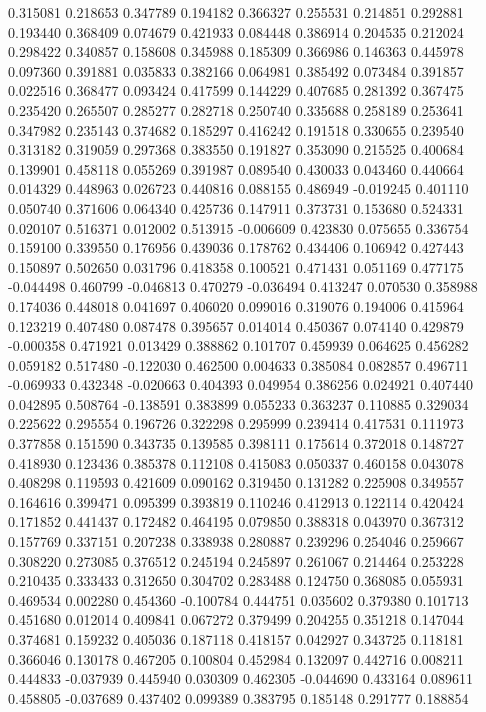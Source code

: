 0.315081
0.218653
0.347789
0.194182
0.366327
0.255531
0.214851
0.292881
0.193440
0.368409
0.074679
0.421933
0.084448
0.386914
0.204535
0.212024
0.298422
0.340857
0.158608
0.345988
0.185309
0.366986
0.146363
0.445978
0.097360
0.391881
0.035833
0.382166
0.064981
0.385492
0.073484
0.391857
0.022516
0.368477
0.093424
0.417599
0.144229
0.407685
0.281392
0.367475
0.235420
0.265507
0.285277
0.282718
0.250740
0.335688
0.258189
0.253641
0.347982
0.235143
0.374682
0.185297
0.416242
0.191518
0.330655
0.239540
0.313182
0.319059
0.297368
0.383550
0.191827
0.353090
0.215525
0.400684
0.139901
0.458118
0.055269
0.391987
0.089540
0.430033
0.043460
0.440664
0.014329
0.448963
0.026723
0.440816
0.088155
0.486949
-0.019245
0.401110
0.050740
0.371606
0.064340
0.425736
0.147911
0.373731
0.153680
0.524331
0.020107
0.516371
0.012002
0.513915
-0.006609
0.423830
0.075655
0.336754
0.159100
0.339550
0.176956
0.439036
0.178762
0.434406
0.106942
0.427443
0.150897
0.502650
0.031796
0.418358
0.100521
0.471431
0.051169
0.477175
-0.044498
0.460799
-0.046813
0.470279
-0.036494
0.413247
0.070530
0.358988
0.174036
0.448018
0.041697
0.406020
0.099016
0.319076
0.194006
0.415964
0.123219
0.407480
0.087478
0.395657
0.014014
0.450367
0.074140
0.429879
-0.000358
0.471921
0.013429
0.388862
0.101707
0.459939
0.064625
0.456282
0.059182
0.517480
-0.122030
0.462500
0.004633
0.385084
0.082857
0.496711
-0.069933
0.432348
-0.020663
0.404393
0.049954
0.386256
0.024921
0.407440
0.042895
0.508764
-0.138591
0.383899
0.055233
0.363237
0.110885
0.329034
0.225622
0.295554
0.196726
0.322298
0.295999
0.239414
0.417531
0.111973
0.377858
0.151590
0.343735
0.139585
0.398111
0.175614
0.372018
0.148727
0.418930
0.123436
0.385378
0.112108
0.415083
0.050337
0.460158
0.043078
0.408298
0.119593
0.421609
0.090162
0.319450
0.131282
0.225908
0.349557
0.164616
0.399471
0.095399
0.393819
0.110246
0.412913
0.122114
0.420424
0.171852
0.441437
0.172482
0.464195
0.079850
0.388318
0.043970
0.367312
0.157769
0.337151
0.207238
0.338938
0.280887
0.239296
0.254046
0.259667
0.308220
0.273085
0.376512
0.245194
0.245897
0.261067
0.214464
0.253228
0.210435
0.333433
0.312650
0.304702
0.283488
0.124750
0.368085
0.055931
0.469534
0.002280
0.454360
-0.100784
0.444751
0.035602
0.379380
0.101713
0.451680
0.012014
0.409841
0.067272
0.379499
0.204255
0.351218
0.147044
0.374681
0.159232
0.405036
0.187118
0.418157
0.042927
0.343725
0.118181
0.366046
0.130178
0.467205
0.100804
0.452984
0.132097
0.442716
0.008211
0.444833
-0.037939
0.445940
0.030309
0.462305
-0.044690
0.433164
0.089611
0.458805
-0.037689
0.437402
0.099389
0.383795
0.185148
0.291777
0.188854
